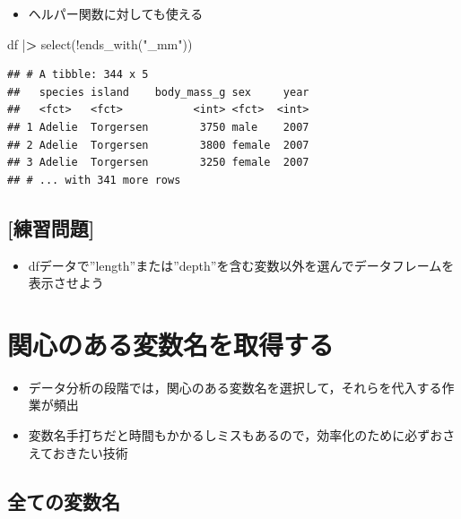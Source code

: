\documentclass[
  xelatex,ja=standard, b5paper]{bxjsbook}
\newenvironment{Shaded}{\begin{snugshade}}{\end{snugshade}}
\newcommand{\ErrorTok}[1]{\textcolor[rgb]{0.64,0.00,0.00}{\textbf{#1}}}
\newcommand{\FunctionTok}[1]{\textcolor[rgb]{0.00,0.00,0.00}{#1}}
\newcommand{\NormalTok}[1]{#1}
\newcommand{\SpecialCharTok}[1]{\textcolor[rgb]{0.00,0.00,0.00}{#1}}
\newcommand{\StringTok}[1]{\textcolor[rgb]{0.31,0.60,0.02}{#1}}
\providecommand{\tightlist}{%
  \setlength{\itemsep}{0pt}\setlength{\parskip}{0pt}}
\begin{document}
\begin{itemize}
\tightlist
\item
  ヘルパー関数に対しても使える
\end{itemize}

\begin{Shaded}
\begin{Highlighting}[]
\NormalTok{df }\SpecialCharTok{|}\ErrorTok{\textgreater{}} 
  \FunctionTok{select}\NormalTok{(}\SpecialCharTok{!}\FunctionTok{ends\_with}\NormalTok{(}\StringTok{"\_mm"}\NormalTok{))}
\end{Highlighting}
\end{Shaded}

\begin{verbatim}
## # A tibble: 344 x 5
##   species island    body_mass_g sex     year
##   <fct>   <fct>           <int> <fct>  <int>
## 1 Adelie  Torgersen        3750 male    2007
## 2 Adelie  Torgersen        3800 female  2007
## 3 Adelie  Torgersen        3250 female  2007
## # ... with 341 more rows
\end{verbatim}

\hypertarget{ux7df4ux7fd2ux554fux984c-2}{%
\subsection{{[}練習問題{]}}\label{ux7df4ux7fd2ux554fux984c-2}}

\begin{itemize}
\tightlist
\item
  dfデータで''length''または''depth''を含む変数以外を選んでデータフレームを表示させよう
\end{itemize}

\hypertarget{select-get}{%
\section{関心のある変数名を取得する}\label{select-get}}

\begin{itemize}
\tightlist
\item
  データ分析の段階では，関心のある変数名を選択して，それらを代入する作業が頻出
\item
  変数名手打ちだと時間もかかるしミスもあるので，効率化のために必ずおさえておきたい技術
\end{itemize}

\hypertarget{select-get-name}{%
\subsection{全ての変数名}\label{select-get-name}}
\end{document}
